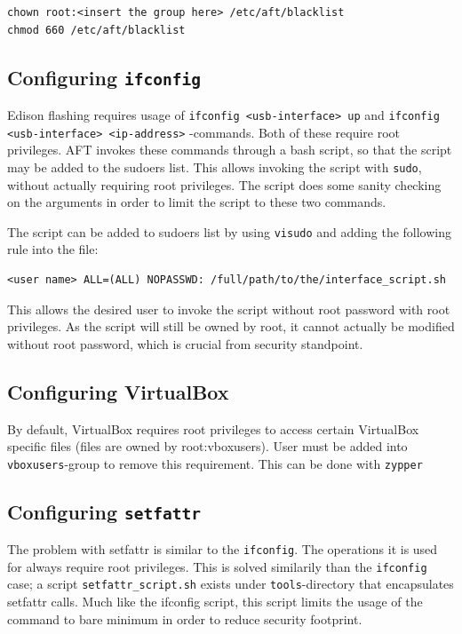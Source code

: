 \documentclass[a4paper,11pt]{article}
\newcommand{\cmd}[1]{\texttt{#1}}
\begin{document}
\begin{lstlisting}
chown root:<insert the group here> /etc/aft/blacklist
chmod 660 /etc/aft/blacklist
\end{lstlisting}

\subsection*{Configuring \cmd{ifconfig}}

Edison flashing requires usage of \cmd{ifconfig <usb-interface> up} and \cmd{ifconfig <usb-interface> <ip-address>} -commands. Both of these require root privileges. AFT invokes these commands through a bash script, so that the script may be added to the sudoers list. This allows invoking the script with \cmd{sudo}, without actually requiring root privileges. The script does some sanity checking on the arguments in order to limit the script to these two commands. 

The script can be added to sudoers list by using \cmd{visudo}
and adding the following rule into the file:

\begin{lstlisting}
<user name> ALL=(ALL) NOPASSWD: /full/path/to/the/interface_script.sh
\end{lstlisting}
This allows the desired user to invoke the script without root password with root privileges. As the script will still be owned by root, it cannot actually be modified without root password, which is crucial from security standpoint. 

\subsection*{Configuring VirtualBox}
\label{virtualboxnoroot}

By default, VirtualBox requires root privileges to access certain VirtualBox specific files (files are owned by root:vboxusers). User must be added into \cmd{vboxusers}-group to remove this requirement. This can be done with \cmd{zypper}

\subsection*{Configuring \cmd{setfattr}}
\label{virtualboxsetfattr}
The problem with setfattr is similar to the \cmd{ifconfig}. The operations it is used for always require root privileges. This is solved similarily than the \cmd{ifconfig} case; a script \cmd{setfattr\_script.sh} exists under \cmd{tools}-directory that encapsulates setfattr calls. Much like the ifconfig script, this script limits the usage of the command to bare minimum in order to reduce security footprint.
\end{document}
